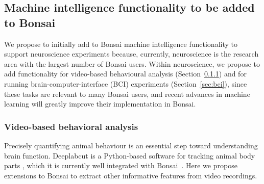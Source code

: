 \subsection{Machine intelligence functionality to be added to Bonsai}
\label{sec:functionality}

We propose to initially add to Bonsai machine intelligence functionality to
support neuroscience experiments because, currently, neuroscience is the
research area with the largest number of Bonsai users. Within neuroscience, we
propose to add functionality for video-based behavioural analysis
(Section~\ref{sec:videoBasedBehavioralAnalysis}) and for running
brain-computer-interface (BCI) experiments (Section~\ref{sec:bci}), since these tasks
are relevant to many Bonsai users, and recent advances in machine learning
will greatly improve their implementation in Bonsai.

\subsubsection{Video-based behavioral analysis}
\label{sec:videoBasedBehavioralAnalysis}

Precisely quantifying animal behaviour is an essential step toward understanding
brain function.  Deeplabcut is a Python-based software for tracking animal body
parts \citep{mathisEtAl18}, which it is currently well integrated with
Bonsai~\citep{kaneEtAl20}. Here we propose extensions to Bonsai to extract
other informative features from video recordings.


